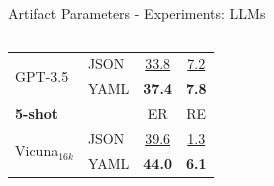 \documentclass[en,16:9,smallfoot]{sdqbeamer}
\begin{document}
\begin{frame}{Artifact Parameters - Experiments: LLMs}
\begin{columns}
\begin{overlayarea}{\textwidth}{7cm}
{\begin{table}
\begin{small}
\begin{tabular}{ll|cc}
        \multirow{2}{*}{GPT-3.5} &
        JSON & \underline{33.8}
             & \underline{7.2} \\
        \ & YAML &
        \hphantom{${}_{\Delta\text{+3.6}}$}
        \textbf{37.4}{\color{parametergreen}{${}_{\Delta\text{+3.6}}$}}
                  &
        \hphantom{${}_{\Delta\text{+0.6}}$}
        \textbf{7.8}{\color{parametergreen}{${}_{\Delta\text{+0.6}}$}}  \\

      \hline
        \multicolumn{2}{l|}{\textbf{5-shot}} &
        ER &
        RE \\
      \hline

        \multirow{2}{*}{Vicuna${}_{16k}$} &
        JSON & \underline{39.6}
             & \underline{1.3} \\
        \ & YAML &
        \hphantom{${}_{\Delta\text{+0.4}}$}
        \textbf{44.0}{\color{parametergreen}{${}_{\Delta\text{+0.4}}$}}
                  &
        \hphantom{${}_{\Delta\text{+4.8}}$}
        \textbf{6.1}{\color{parametergreen}{${}_{\Delta\text{+4.8}}$}}  \\
      \hline
      \end{tabular}
     \end{small}
    \end{table}

        }
        \end{overlayarea}
   \end{columns}

   \end{frame}
\end{document}
